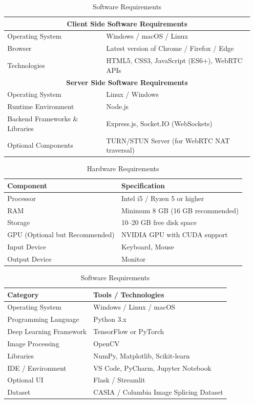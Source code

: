 \begin{table}[h]
\centering
\caption{Software Requirements}
\label{tab:software_requirements_combined}
\begin{tabular}{|l|l|}
\hline
\multicolumn{2}{|c|}{\textbf{Client Side Software Requirements}} \\
\hline
Operating System & Windows / macOS / Linux \\
Browser & Latest version of Chrome / Firefox / Edge \\
Technologies & HTML5, CSS3, JavaScript (ES6+), WebRTC APIs \\
\hline
\multicolumn{2}{|c|}{\textbf{Server Side Software Requirements}} \\
\hline
Operating System & Linux / Windows \\
Runtime Environment & Node.js \\
Backend Frameworks \& Libraries & Express.js, Socket.IO (WebSockets) \\
Optional Components & TURN/STUN Server (for WebRTC NAT traversal) \\
\hline
\end{tabular}
\end{table}



\begin{table}[h]
\centering
\caption{Hardware Requirements}
\label{tab:ml_hardware}
\begin{tabular}{|l|l|}
\hline
\textbf{Component} & \textbf{Specification} \\
\hline
Processor & Intel i5 / Ryzen 5 or higher \\
RAM & Minimum 8 GB (16 GB recommended) \\
Storage & 10--20 GB free disk space \\
GPU (Optional but Recommended) & NVIDIA GPU with CUDA support \\
Input Device & Keyboard, Mouse \\
Output Device & Monitor \\
\hline
\end{tabular}
\end{table}


\begin{table}[h]
\centering
\caption{Software Requirements}
\label{tab:ml_software}
\begin{tabular}{|l|l|}
\hline
\textbf{Category} & \textbf{Tools / Technologies} \\
\hline
Operating System & Windows / Linux / macOS \\
Programming Language & Python 3.x \\
Deep Learning Framework & TensorFlow or PyTorch \\
Image Processing & OpenCV \\
Libraries & NumPy, Matplotlib, Scikit-learn \\
IDE / Environment & VS Code, PyCharm, Jupyter Notebook \\
Optional UI & Flask / Streamlit \\
Dataset & CASIA / Columbia Image Splicing Dataset \\
\hline
\end{tabular}
\end{table}